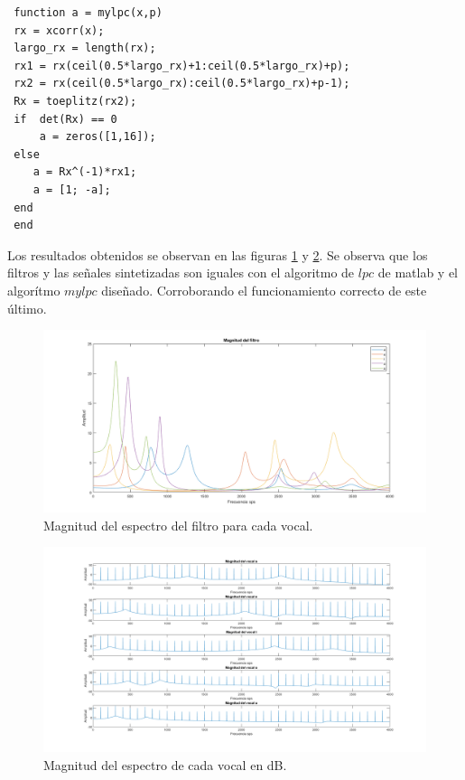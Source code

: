 \documentclass[letterpaper,onecolumn,10pt,journal,final]{IEEEtran}
\begin{document}
\begin{enumerate}[1)]
%
\begin{lstlisting}
 function a = mylpc(x,p)
 rx = xcorr(x);
 largo_rx = length(rx);
 rx1 = rx(ceil(0.5*largo_rx)+1:ceil(0.5*largo_rx)+p);
 rx2 = rx(ceil(0.5*largo_rx):ceil(0.5*largo_rx)+p-1);
 Rx = toeplitz(rx2);
 if  det(Rx) == 0
     a = zeros([1,16]);
 else
    a = Rx^(-1)*rx1;
    a = [1; -a];
 end
 end
\end{lstlisting}
%
Los resultados obtenidos se observan en las figuras \ref{P1_4a} y \ref{P1_4b}. Se observa que los filtros y las señales sintetizadas son iguales con el algoritmo de $lpc$ de matlab y el algorítmo $mylpc$ diseñado. Corroborando el funcionamiento correcto de este último.
%
\begin{figure}[H]
\centering
\includegraphics[width=1 \linewidth]{Figuras/P1_4a.png}
\caption{Magnitud del espectro del filtro para cada vocal.}
\label{P1_4a}
\end{figure} 
%
\begin{figure}[H]
\centering
\includegraphics[width=1 \linewidth]{Figuras/P1_4b.png}
\caption{Magnitud del espectro de cada vocal en dB.}
\label{P1_4b}
\end{figure} 
%
\end{enumerate}
%
%
\end{document}
